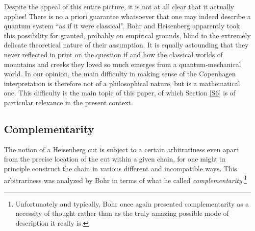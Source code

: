 \documentclass[12pt,titlepage]{article}
\begin{document}
Despite the appeal of this entire picture, it is not at all clear that it actually applies! There is no a priori guarantee whatsoever that one may indeed describe a quantum system ``as if it were classical''.  Bohr and Heisenberg apparently took this possibility for granted, probably on empirical grounds, blind to  the extremely delicate theoretical nature of their assumption. It is equally astounding that they never reflected in print on the question if and how  the classical worlds of mountains and creeks they loved so much emerges from  a quantum-mechanical world. In our opinion, the main difficulty in making sense of the Copenhagen interpretation is therefore not of a philosophical nature, 
but is a mathematical one. This difficulty is the main topic of this paper, of which Section \ref{S6} is of particular relevance in the present context.
\subsection{Complementarity}\label{compl}
The notion of a Heisenberg cut is subject to a certain arbitrariness even apart from the precise location of the cut within a given chain, for one might in principle construct the chain in various different and incompatible ways. This arbitrariness was analyzed by Bohr in terms of what he called \textit{complementarity}.\footnote{Unfortunately and typically, Bohr 
once again presented complementarity as a necessity of thought rather than as the truly amazing  possible mode of description it really is.} 
\end{document}
